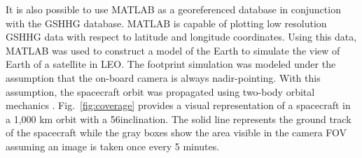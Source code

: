 \documentclass[]{aiaa-tc}%
\begin{document}
It is also possible to use MATLAB as a georeferenced database in conjunction with the GSHHG database.  MATLAB is capable of plotting low resolution GSHHG data with respect to latitude and longitude coordinates.  Using this data, MATLAB was used to construct a model of the Earth to simulate the view of Earth of a satellite in LEO.  The footprint simulation was modeled under the assumption that the on-board camera is always nadir-pointing.  With this assumption, the spacecraft orbit was propagated using two-body orbital mechanics \cite{UnderstandingSpace}.  Fig.~\ref{fig:coverage} provides a visual representation of a spacecraft in a 1,000 km orbit with a 56\degree inclination.  The solid line represents the ground track of the spacecraft while the gray boxes show the area visible in the camera FOV assuming an image is taken once every 5 minutes.
\end{document}
